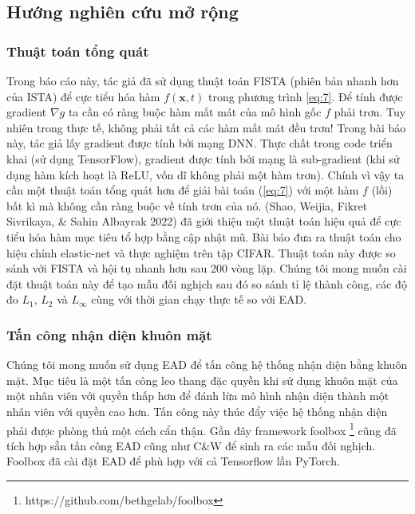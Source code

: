 \subsection{Hướng nghiên cứu mở rộng}
\subsubsection{Thuật toán tổng quát}
Trong báo cáo này, tác giả đã sử dụng thuật toán FISTA (phiên bản nhanh hơn của ISTA) để cực tiểu hóa hàm $f(\mathbf{x}, t)$ trong phương trình \ref{eq:7}. Để tính được gradient $\nabla g$ ta cần có ràng buộc hàm mất mát của mô hình gốc $f$ phải trơn. Tuy nhiên trong thực tế, không phải tất cả các hàm mất mát đều trơn! Trong bài báo này, tác giả lấy gradient được tính bởi mạng DNN. Thực chất trong code triển khai (sử dụng TensorFlow), gradient được tính bởi mạng là sub-gradient (khi sử dụng hàm kích hoạt là ReLU, vốn dĩ không phải một hàm trơn). Chính vì vậy ta cần một thuật toán tổng quát hơn để giải bài toán (\ref{eq:7}) với một hàm $f$ (lồi) bất kì mà không cần ràng buộc về tính trơn của nó. (Shao, Weijia, Fikret Sivrikaya, \& Sahin Albayrak 2022) đã giới thiệu một thuật toán hiệu quả để cực tiểu hóa hàm mục tiêu tổ hợp bằng cập nhật mũ. Bài báo đưa ra thuật toán cho hiệu chỉnh elastic-net và thực nghiệm trên tập CIFAR. Thuật toán này được so sánh với FISTA và hội tụ nhanh hơn sau 200 vòng lặp. Chúng tôi mong muốn cài đặt thuật toán này để tạo mẫu đối nghịch sau đó so sánh tỉ lệ thành công, các độ đo $L_1$, $L_2$ và $L_{\infty}$ cùng với thời gian chạy thực tế so với EAD.
\subsubsection{Tấn công nhận diện khuôn mặt}
Chúng tôi mong muốn sử dụng EAD để tấn công hệ thống nhận diện bằng khuôn mặt. Mục tiêu là một tấn công leo thang đặc quyền khi sử dụng khuôn mặt của một nhân viên với quyền thấp hơn để đánh lừa mô hình nhận diện thành một nhân viên với quyền cao hơn. Tấn công này thúc đẩy việc hệ thống nhận diện phải được phòng thủ một cách cẩn thận. Gần đây framework foolbox \footnote{https://github.com/bethgelab/foolbox} cũng đã tích hợp sẵn tấn công EAD cũng như C\&W để sinh ra các mẫu đối nghịch. Foolbox đã cài đặt EAD để phù hợp với cả Tensorflow lần PyTorch.


